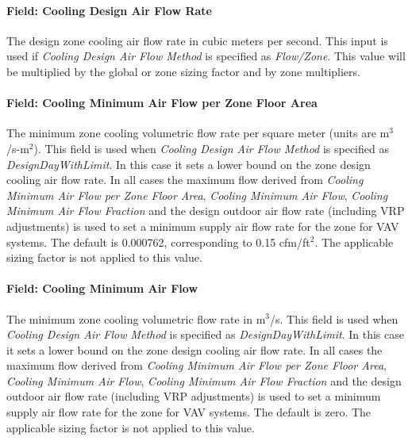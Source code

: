 \paragraph{Field: Cooling Design Air Flow Rate}\label{field-cooling-design-air-flow-rate}

The design zone cooling air flow rate in cubic meters per second. This input is used if \emph{Cooling Design Air Flow Method} is specified as \emph{Flow/Zone}. This value will be multiplied by the global or zone sizing factor and by zone multipliers.

\paragraph{Field: Cooling Minimum Air Flow per Zone Floor Area}\label{field-cooling-minimum-air-flow-per-zone-floor-area}

The minimum zone cooling volumetric flow rate per square meter (units are m\(^{3}\)/s-m\(^{2}\)). This field is used when \emph{Cooling Design Air Flow Method} is specified as \emph{DesignDayWithLimit}. In this case it sets a lower bound on the zone design cooling air flow rate. In all cases the maximum flow derived from \emph{Cooling Minimum Air Flow per Zone Floor Area}, \emph{Cooling Minimum Air Flow}, \emph{Cooling Minimum Air Flow Fraction} and the design outdoor air flow rate (including VRP adjustments) is used to set a minimum supply air flow rate for the zone for VAV systems. The default is 0.000762, corresponding to 0.15 cfm/ft\(^{2}\). The applicable sizing factor is not applied to this value.

\paragraph{Field: Cooling Minimum Air Flow}\label{field-cooling-minimum-air-flow}

The minimum zone cooling volumetric flow rate in m\(^{3}\)/s. This field is used when \emph{Cooling Design Air Flow Method} is specified as \emph{DesignDayWithLimit}. In this case it sets a lower bound on the zone design cooling air flow rate.  In all cases the maximum flow derived from \emph{Cooling Minimum Air Flow per Zone Floor Area}, \emph{Cooling Minimum Air Flow}, \emph{Cooling Minimum Air Flow Fraction} and the design outdoor air flow rate (including VRP adjustments) is used to set a minimum supply air flow rate for the zone for VAV systems. The default is zero. The applicable sizing factor is not applied to this value.

